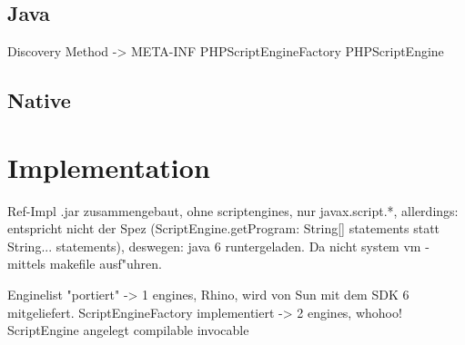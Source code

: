 \subsection{Java}
\label{sec:chap1:design:java}
Discovery Method -> META-INF
PHPScriptEngineFactory
PHPScriptEngine

\subsection{Native}
\label{sec:chap1:design:native}


\section{Implementation}
\label{sec:chap1:impl}

Ref-Impl .jar zusammengebaut, ohne scriptengines, nur javax.script.*, allerdings: entspricht nicht der Spez 
(ScriptEngine.getProgram: String[] statements statt String... statements), deswegen: java 6 runtergeladen.
Da nicht system vm - mittels makefile ausf"uhren.

Enginelist "portiert" -> 1 engines, Rhino, wird von Sun mit dem SDK 6 mitgeliefert.
ScriptEngineFactory implementiert -> 2 engines, whohoo!
ScriptEngine angelegt
compilable
invocable




